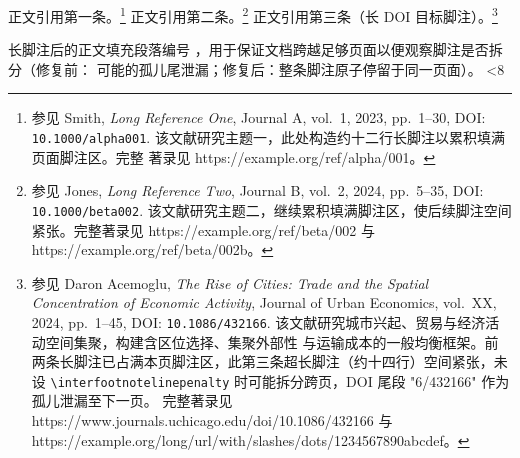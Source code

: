 \documentclass[doctor]{htuthesis}
\begin{document}
正文引用第一条。\footnote{参见 Smith, \emph{Long Reference One}, Journal A, vol.~1, 2023, pp.~1--30,
DOI: \texttt{10.1000/alpha001}. 该文献研究主题一，此处构造约十二行长脚注以累积填满页面脚注区。完整
著录见 https://example.org/ref/alpha/001。}
正文引用第二条。\footnote{参见 Jones, \emph{Long Reference Two}, Journal B, vol.~2, 2024, pp.~5--35,
DOI: \texttt{10.1000/beta002}. 该文献研究主题二，继续累积填满脚注区，使后续脚注空间紧张。完整著录见
https://example.org/ref/beta/002 与 https://example.org/ref/beta/002b。}
正文引用第三条（长 DOI 目标脚注）。\footnote{参见 Daron Acemoglu, \emph{The Rise of Cities: Trade and the
Spatial Concentration of Economic Activity}, Journal of Urban Economics, vol.~XX, 2024, pp.~1--45,
DOI: \texttt{10.1086/432166}. 该文献研究城市兴起、贸易与经济活动空间集聚，构建含区位选择、集聚外部性
与运输成本的一般均衡框架。前两条长脚注已占满本页脚注区，此第三条超长脚注（约十四行）空间紧张，未设
\texttt{\textbackslash interfootnotelinepenalty} 时可能拆分跨页，DOI 尾段 "6/432166" 作为孤儿泄漏至下一页。
完整著录见 https://www.journals.uchicago.edu/doi/10.1086/432166 与
https://example.org/long/url/with/slashes/dots/1234567890abcdef。}

\setcounter{filler@c}{0}
\loop
{}
长脚注后的正文填充段落编号 ，用于保证文档跨越足够页面以便观察脚注是否拆分（修复前：
可能的孤儿尾泄漏；修复后：整条脚注原子停留于同一页面）。
\ifnum\value{filler@c}<8 \repeat
\end{document}
